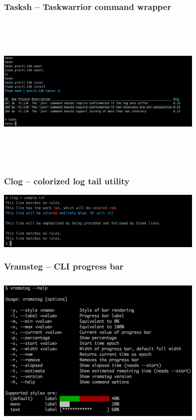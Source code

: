 \documentclass[t]{beamer}
\begin{document}
\begin{frame}\frametitle{Tasksh -- Taskwarrior command wrapper}
    \begin{center}
        \href{http://tasktools.org/projects/tasksh.html}{\includegraphics[width=10cm,height=7.5cm]{tasksh.png}}
    \end{center}
\end{frame}

\begin{frame}\frametitle{Clog -- colorized log tail utility}
    \vfill
    \begin{center}
        \href{http://tasktools.org/projects/clog.html}{\includegraphics[width=10cm]{clog.png}}
    \end{center}
    \vfill
\end{frame}

\begin{frame}\frametitle{Vramsteg -- CLI progress bar}
    \begin{center}
        \href{http://tasktools.org/projects/vramsteg.html}{\includegraphics[width=10cm,height=7.5cm]{vramsteg.png}}
    \end{center}
\end{frame}
\end{document}

